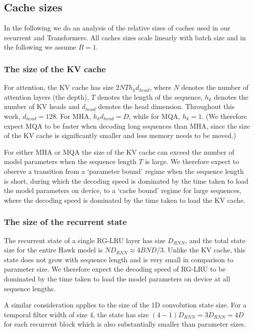 \documentclass[11pt, a4paper, logo, onecolumn]{googledeepmind}
\theoremstyle{definition}
\begin{document}
\subsection{Cache sizes}\label{appendix:cache_sizes}
In the following we do an analysis of the relative sizes of caches used in our recurrent and Transformers. All caches sizes scale linearly with batch size and in the following we assume $B=1$.
\subsubsection{The size of the KV cache}
For attention, the KV cache has size $2NTh_k d_{head}$, where $N$ denotes the number of attention layers (the depth), $T$ denotes the length of the sequence, $h_k$ denotes the number of KV heads and $d_{head}$ denotes the head dimension. Throughout this work, $d_{head} = 128$. For MHA, $h_k d_{head} = D$, while for MQA, $h_k = 1$. (We therefore expect MQA to be faster when decoding long sequences than MHA, since the size of the KV cache is significantly smaller and less memory needs to be moved.)

For either MHA or MQA the size of the KV cache can exceed the number of model parameters when the sequence length $T$ is large. We therefore expect to observe a transition from a `parameter bound' regime when the sequence length is short, during which the decoding speed is dominated by the time taken to load the model parameters on device, to a `cache bound' regime for large sequences, where the decoding speed is dominated by the time taken to load the KV cache.

\subsubsection{The size of the recurrent state}

The recurrent state of a single RG-LRU layer has size $D_{RNN}$, and the total state size for the entire Hawk model is $ND_{RNN} \approx 4BND/3$. Unlike the KV cache, this state does not grow with sequence length and is very small in comparison to parameter size. We therefore expect the decoding speed of RG-LRU to be dominated by the time taken to load the model parameters on device at all sequence lengths.

A similar consideration applies to the size of the 1D convolution state size. For a temporal filter width of size 4, the state has size $(4-1)D_{RNN}=3D_{RNN}=4D$ for each recurrent block which is also substantially smaller than parameter sizes.
\end{document}
